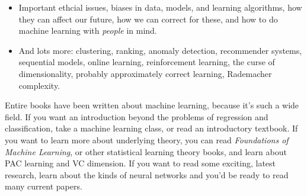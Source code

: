 \documentclass[11pt,paper=letter]{scrartcl}
\begin{document}
\begin{itemize}
  \item Important ethcial issues, biases in data, models, and learning algorithms, how they can affect our future, how we can correct for these, and how to do machine learning with \textit{people} in mind.

  \item And lots more: clustering, ranking, anomaly detection, recommender systems, sequential models, online learning, reinforcement learning, the curse of dimensionality, probably approximately correct learning, Rademacher complexity.
\end{itemize}

Entire books have been written about machine learning, because it's such a wide field. If you want an introduction beyond the problems of regression and classification, take a machine learning class, or read an introductory textbook. If you want to learn more about underlying theory, you can read \textit{Foundations of Machine Learning}, or other statistical learning theory books, and learn about PAC learning and VC dimension. If you want to read some exciting, latest research, learn about the kinds of neural networks and you'd be ready to read many current papers.
\end{document}
